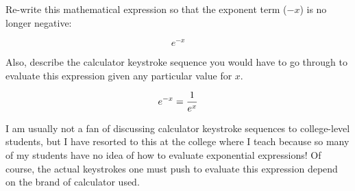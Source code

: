 

Re-write this mathematical expression so that the exponent term ($-x$) is no longer negative:

$$e^{-x}$$

Also, describe the calculator keystroke sequence you would have to go through to evaluate this expression given any particular value for $x$.







$$e^{-x} = {1 \over {e^x}}$$







I am usually not a fan of discussing calculator keystroke sequences to college-level students, but I have resorted to this at the college where I teach because so many of my students have no idea of how to evaluate exponential expressions!  Of course, the actual keystrokes one must push to evaluate this expression depend on the brand of calculator used.




